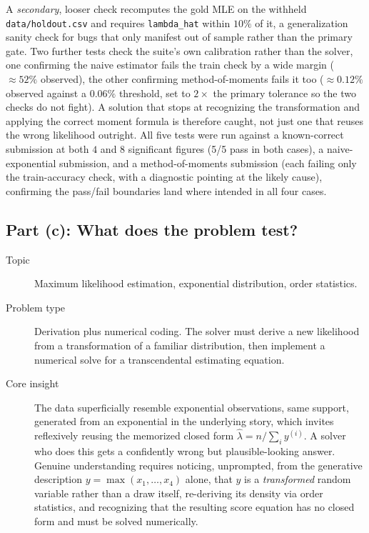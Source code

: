 \documentclass[11pt]{article}
\begin{document}
A \emph{secondary}, looser check recomputes the gold MLE on the withheld
\texttt{data/holdout.csv} and requires \texttt{lambda\_hat} within $10\%$ of it,
a generalization sanity check for bugs that only manifest out of sample rather
than the primary gate. Two further tests check the suite's own calibration
rather than the solver, one confirming the naive estimator fails the train
check by a wide margin ($\approx 52\%$ observed), the other confirming
method-of-moments fails it too ($\approx 0.12\%$ observed against a $0.06\%$
threshold, set to $2\times$ the primary tolerance so the two checks do not
fight). A solution that stops at recognizing the transformation and applying
the correct moment formula is therefore caught, not just one that reuses the
wrong likelihood outright. All five tests were run against a known-correct
submission at both $4$ and $8$ significant figures (5/5 pass in both cases), a
naive-exponential submission, and a method-of-moments submission (each failing
only the train-accuracy check, with a diagnostic pointing at the likely cause),
confirming the pass/fail boundaries land where intended in all four cases.

\subsection*{Part (c): What does the problem test?}

\begin{description}
  \item[Topic] Maximum likelihood estimation, exponential distribution, order
  statistics.
  \item[Problem type] Derivation plus numerical coding. The solver must derive a
  new likelihood from a transformation of a familiar distribution, then
  implement a numerical solve for a transcendental estimating equation.
  \item[Core insight] The data superficially resemble exponential observations,
  same support, generated from an exponential in the underlying story, which
  invites reflexively reusing the memorized closed form
  $\hat\lambda = n/\sum_i y^{(i)}$. A solver who does this gets a confidently
  wrong but plausible-looking answer. Genuine understanding requires noticing,
  unprompted, from the generative description $y=\max(x_1,\dots,x_4)$ alone,
  that $y$ is a \emph{transformed} random variable rather than a draw itself,
  re-deriving its density via order statistics, and recognizing that the
  resulting score equation has no closed form and must be solved numerically.
\end{description}
\end{document}
